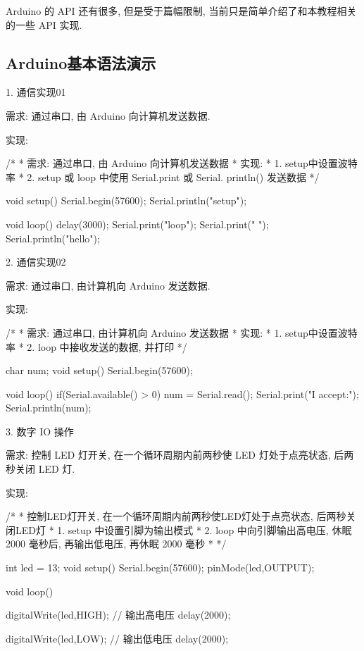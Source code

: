 \documentclass[openany, fontset=windowsold]{ctexbook}
\theoremstyle{kaiti}
\theoremstyle{normal}
\begin{document}
Arduino 的 API 还有很多, 但是受于篇幅限制, 当前只是简单介绍了和本教程相关的一些 API 实现.

\subsection{Arduino基本语法演示}

1. 通信实现01

需求: 通过串口, 由 Arduino 向计算机发送数据.

实现:

\begin{cpp}
  /*
   * 需求: 通过串口, 由 Arduino 向计算机发送数据
   * 实现:
   *  1. setup中设置波特率
   *  2. setup 或 loop 中使用 Serial.print 或 Serial. println() 发送数据
   */

  void setup() {
    Serial.begin(57600);
    Serial.println("setup");
  }

  void loop() {
    delay(3000);
    Serial.print("loop");
    Serial.print("  ");
    Serial.println("hello");
  }
\end{cpp}

2. 通信实现02

需求: 通过串口, 由计算机向 Arduino 发送数据.

实现:

\begin{cpp}
  /*
   * 需求: 通过串口, 由计算机向 Arduino 发送数据
   * 实现:
   *  1. setup中设置波特率
   *  2. loop 中接收发送的数据, 并打印
   */

  char num;
  void setup() {
    Serial.begin(57600);
  }

  void loop() {
    if(Serial.available() > 0){
      num = Serial.read();
      Serial.print("I accept:");
      Serial.println(num);  
    }
  }
\end{cpp}

3. 数字 IO 操作

需求: 控制 LED 灯开关, 在一个循环周期内前两秒使 LED 灯处于点亮状态, 后两秒关闭 LED 灯.

实现:

\begin{cpp}
  /*
   * 控制LED灯开关, 在一个循环周期内前两秒使LED灯处于点亮状态, 后两秒关闭LED灯
   * 1. setup 中设置引脚为输出模式
   * 2. loop 中向引脚输出高电压, 休眠 2000 毫秒后, 再输出低电压, 再休眠 2000 毫秒
   * 
   */

  int led = 13;
  void setup() {
    Serial.begin(57600);
    pinMode(led,OUTPUT);
  }

  void loop() {
    digitalWrite(led,HIGH); // 输出高电压  
    delay(2000);

    digitalWrite(led,LOW); // 输出低电压
    delay(2000); 
  }
\end{cpp}
\end{document}
